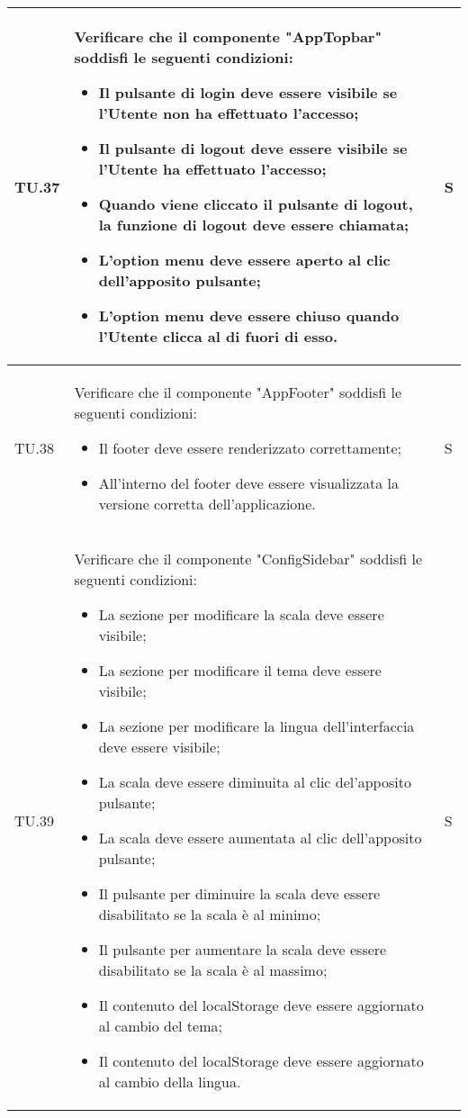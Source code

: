 \begin{adjustwidth}{-0.5cm}{-0.5cm}
\begin{longtable}{|P{1.5cm}|>{\raggedright}P{9.5cm}|>{\arraybackslash}P{1.5cm}|}
		\hline TU.37 & Verificare che il componente "AppTopbar" soddisfi le seguenti condizioni:
    \begin{itemize}
      \item Il pulsante di login deve essere visibile se l'Utente non ha effettuato l'accesso;
			\item Il pulsante di logout deve essere visibile se l'Utente ha effettuato l'accesso;
			\item Quando viene cliccato il pulsante di logout, la funzione di logout deve essere chiamata;
			\item L'option menu deve essere aperto al clic dell'apposito pulsante;
			\item L'option menu deve essere chiuso quando l'Utente clicca al di fuori di esso.
    \end{itemize} & S \\

		\hline TU.38 & Verificare che il componente "AppFooter" soddisfi le seguenti condizioni:
    \begin{itemize}
      \item Il footer deve essere renderizzato correttamente;
			\item All'interno del footer deve essere visualizzata la versione corretta dell'applicazione.
    \end{itemize} & S \\

		\hline TU.39 & Verificare che il componente "ConfigSidebar" soddisfi le seguenti condizioni:
    \begin{itemize}
      \item La sezione per modificare la scala deve essere visibile;
			\item La sezione per modificare il tema deve essere visibile;
			\item La sezione per modificare la lingua dell'interfaccia deve essere visibile;
			\item La scala deve essere diminuita al clic del'apposito pulsante;
			\item La scala deve essere aumentata al clic dell'apposito pulsante;
			\item Il pulsante per diminuire la scala deve essere disabilitato se la scala è al minimo;
			\item Il pulsante per aumentare la scala deve essere disabilitato se la scala è al massimo;
			\item Il contenuto del localStorage deve essere aggiornato al cambio del tema;
			\item Il contenuto del localStorage deve essere aggiornato al cambio della lingua.
    \end{itemize} & S \\


\end{longtable}
\end{adjustwidth}
